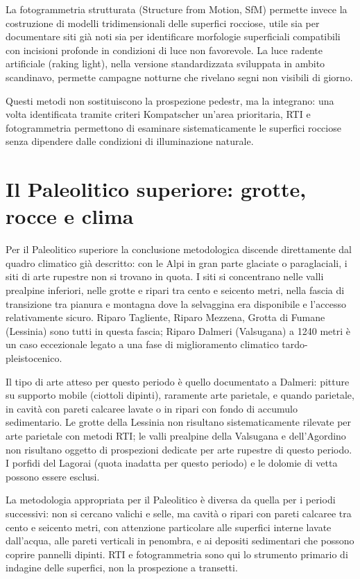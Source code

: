 La fotogrammetria strutturata (Structure from Motion, SfM) permette invece la costruzione di modelli tridimensionali delle superfici rocciose, utile sia per documentare siti già noti sia per identificare morfologie superficiali compatibili con incisioni profonde in condizioni di luce non favorevole. La luce radente artificiale (raking light), nella versione standardizzata sviluppata in ambito scandinavo, permette campagne notturne che rivelano segni non visibili di giorno.

Questi metodi non sostituiscono la prospezione pedestr, ma la integrano: una volta identificata tramite criteri Kompatscher un'area prioritaria, RTI e fotogrammetria permettono di esaminare sistematicamente le superfici rocciose senza dipendere dalle condizioni di illuminazione naturale.

\section{Il Paleolitico superiore: grotte, rocce e clima}

Per il Paleolitico superiore la conclusione metodologica discende direttamente dal quadro climatico già descritto: con le Alpi in gran parte glaciate o paraglaciali, i siti di arte rupestre non si trovano in quota. I siti si concentrano nelle valli prealpine inferiori, nelle grotte e ripari tra cento e seicento metri, nella fascia di transizione tra pianura e montagna dove la selvaggina era disponibile e l'accesso relativamente sicuro. Riparo Tagliente, Riparo Mezzena, Grotta di Fumane (Lessinia) sono tutti in questa fascia; Riparo Dalmeri (Valsugana) a 1240 metri è un caso eccezionale legato a una fase di miglioramento climatico tardo-pleistocenico.

Il tipo di arte atteso per questo periodo è quello documentato a Dalmeri: pitture su supporto mobile (ciottoli dipinti), raramente arte parietale, e quando parietale, in cavità con pareti calcaree lavate o in ripari con fondo di accumulo sedimentario. Le grotte della Lessinia non risultano sistematicamente rilevate per arte parietale con metodi RTI; le valli prealpine della Valsugana e dell'Agordino non risultano oggetto di prospezioni dedicate per arte rupestre di questo periodo. I porfidi del Lagorai (quota inadatta per questo periodo) e le dolomie di vetta possono essere esclusi.

La metodologia appropriata per il Paleolitico è diversa da quella per i periodi successivi: non si cercano valichi e selle, ma cavità o ripari con pareti calcaree tra cento e seicento metri, con attenzione particolare alle superfici interne lavate dall'acqua, alle pareti verticali in penombra, e ai depositi sedimentari che possono coprire pannelli dipinti. RTI e fotogrammetria sono qui lo strumento primario di indagine delle superfici, non la prospezione a transetti.


